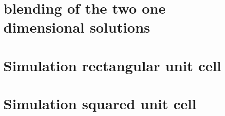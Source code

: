 \section{blending of the two one dimensional solutions}

\section{Simulation rectangular unit cell}

\section{Simulation squared unit cell}